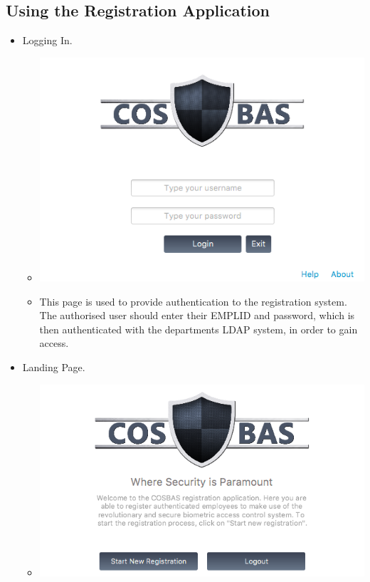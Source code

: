 \subsection{Using the Registration Application}
	\begin{itemize}
		\item Logging In.
			\begin{itemize}
				\item \includegraphics[width=\linewidth]{images/Screenshots/Registration/Reg_Logon.png}
				\item This page is used to provide authentication to the registration system. The authorised user should enter their EMPLID and password, which is then authenticated with the departments LDAP system, in order to gain access.
			\end{itemize}
		\item Landing Page.
			\begin{itemize}
				\item \includegraphics[width=\linewidth]{images/Screenshots/Registration/Reg_Landing.png}

\end{itemize}
\end{itemize}
